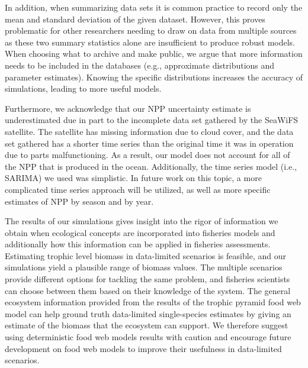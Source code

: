 \documentclass[oneside,12pt,final]{sty/ucthesis-CA2012}
\begin{document}
\begin{mainmatter}
\vspace{5mm}

In addition, when summarizing data sets it is common practice to record only the mean and standard deviation of the given dataset. However, this proves problematic for other researchers needing to draw on data from multiple sources as these two summary statistics alone are insufficient to produce robust models. When choosing what to archive and make public, we argue that more information needs to be included in the databases (e.g., approximate distributions and parameter estimates). Knowing the specific distributions increases the accuracy of simulations, leading to more useful models.

\vspace{5mm}

Furthermore, we acknowledge that our NPP uncertainty estimate is underestimated due in part to the incomplete data set gathered by the SeaWiFS satellite. The satellite has missing information due to cloud cover, and the data set gathered has a shorter time series than the original time it was in operation due to parts malfunctioning. As a result, our model does not account for all of the NPP that is produced in the ocean. Additionally, the time series model (i.e., SARIMA) we used was simplistic. 
In future work on this topic, a more complicated time series approach will be utilized, as well as more specific estimates of NPP by season and by year.

\vspace{5mm}

The results of our simulations gives insight into the rigor of information we obtain when ecological concepts are incorporated into fisheries models and additionally how this information can be applied in fisheries assessments. Estimating trophic level biomass in data-limited scenarios is feasible, and our simulations yield a plausible range of biomass values. The multiple scenarios provide different options for tackling the same problem, and fisheries scientists can choose between them based on their knowledge of the system. The general ecosystem information provided from the results of the trophic pyramid food web model can help ground truth data-limited single-species estimates by giving an estimate of the biomass that the ecosystem can support. We therefore suggest using deterministic food web models results with caution and encourage future development on food web models to improve their usefulness in data-limited scenarios. 



\end{mainmatter}
\end{document}
